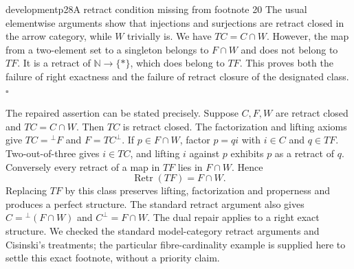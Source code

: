 \begin{dcomment}{development}{p28}{A retract condition missing from footnote 20}
The usual elementwise arguments show that injections and surjections are retract closed in the arrow category, while $W$ trivially is. We have $TC=C\cap W$. However, the map from a two-element set to a singleton belongs to $F\cap W$ and does not belong to $TF$. It is a retract of $\mathbb N\to\{*\}$, which does belong to $TF$. This proves both the failure of right exactness and the failure of retract closure of the designated class.\hfill$\square$

The repaired assertion can be stated precisely. Suppose $C,F,W$ are retract closed and $TC=C\cap W$. Then $TC$ is retract closed. The factorization and lifting axioms give $TC={}^\perp F$ and $F=TC^\perp$. If $p\in F\cap W$, factor $p=qi$ with $i\in C$ and $q\in TF$. Two-out-of-three gives $i\in TC$, and lifting $i$ against $p$ exhibits $p$ as a retract of $q$. Conversely every retract of a map in $TF$ lies in $F\cap W$. Hence
\[
 \operatorname{Retr}(TF)=F\cap W.
\]
Replacing $TF$ by this class preserves lifting, factorization and properness and produces a perfect structure. The standard retract argument also gives $C={}^\perp(F\cap W)$ and $C^\perp=F\cap W$. The dual repair applies to a right exact structure. We checked the standard model-category retract arguments and Cisinski's treatments; the particular fibre-cardinality example is supplied here to settle this exact footnote, without a priority claim.
\end{dcomment}


\clearpage
{}


